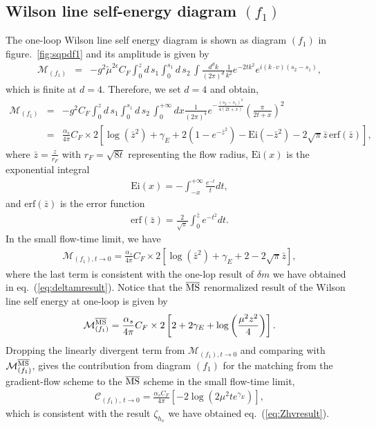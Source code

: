\subsection{Wilson line self-energy diagram $(f_1)$}
 The one-loop Wilson line self energy diagram is shown as diagram $(f_1)$ in figure.~\ref{fig:sqpdf1} and its amplitude is given by
 \begin{eqnarray}
\mathcal{M}_{(f_1)}&=&-g^2\tilde{\mu}^{2\epsilon} C_F \int_0^z d\, s_1\int_0^{s_1} d\, s_2\, \int \frac{d^d k}{(2\pi)^d} \frac{1}{k^2}e^{-2t k^2} e^{i(k\cdot v)(s_2-s_1)},
\end{eqnarray}
which is finite at $d=4$. Therefore, we set $d=4$ and obtain,
\begin{eqnarray}
\label{eq:Wilsonselffull}
\mathcal{M}_{(f_1)}&=&-g^2C_F \int_0^z d\, s_1\int_0^{s_1} d\, s_2\,\int_0^{+\infty} dx \frac{1}{(2\pi)^4}e^{-\frac{(s_2-s_1)^2}{4(2t +x)}}\left(\frac{\pi}{2t +x}\right)^{2}\nonumber\\
&=&\frac{\alpha_s}{4\pi}C_F\times 2\left[\log\left(\bar{z}^2\right) +\gamma_E+2\left(1-e^{-\bar{z}^2}\right)-\text{Ei}\left(-\bar{z}^2\right)-2\sqrt{\pi}\bar{z}\, \text{erf}\left(\bar{z}\right)\right],
\end{eqnarray}
where $\bar{z} =  \frac{z}{r_F}$ with $r_F =\sqrt{8t}$ representing the flow radius, $\text{Ei}\left(x\right)$ is the exponential integral
\begin{eqnarray}
\text{Ei}\left(x\right) = -\int_{-x}^{+\infty} \frac{e^{-t}}{t}dt,
\end{eqnarray}
and $\text{erf}\left(\bar{z}\right)$ is the error function
\begin{eqnarray}
\text{erf}\left(\bar{z}\right) = \frac{2}{\sqrt{\pi}}\int_0^{\bar{z}} e^{-t^2} dt.
\end{eqnarray}
In the small flow-time limit, we have
\begin{eqnarray}
\label{eq:selfsmallflowlimit}
\mathcal{M}_{(f_1), t\rightarrow 0} = \frac{\alpha_s}{4\pi}C_F\times 2\left[\log\left(\bar{z}^2\right) +\gamma_E + 2-2\sqrt{\pi}\bar{z}\right],
\end{eqnarray}
where the last term is consistent with the one-lop result of $\delta m$ we have obtained in eq.~(\ref{eq:deltamresult}).
Notice that the $\overline{\rm MS}$ renormalized result of the Wilson line self energy at one-loop is given by \cite{Izubuchi:2018srq}
\begin{eqnarray}
\mathcal{M}_{(f_1)}^{\overline{\rm MS}} = \frac{\alpha_s}{4\pi}C_F\times 2 \left[2 + 2\gamma_E+ \log\left(\frac{\mu^2z^2}{4}\right)\right].
\end{eqnarray}
Dropping the linearly divergent term from $\mathcal{M}_{(f_1), t\rightarrow 0}$ and comparing with $\mathcal{M}_{(f_1)}^{\overline{\rm MS}} $, gives the contribution from diagram $(f_1)$ for the matching from the gradient-flow scheme to the $\overline{\rm MS}$ scheme in the small flow-time limit,
\begin{eqnarray}
\label{eq:WilsonselfGF2MS}
\mathcal{C}_{(f_1),\, t \rightarrow 0} =  \frac{\alpha_sC_F}{4\pi}\left[-2\log\left(2\mu^2te^{\gamma_E}\right)\right],
\end{eqnarray}
which is consistent with the result $\zeta_{h_v}$ we have obtained eq.~(\ref{eq:Zhvresult}).

